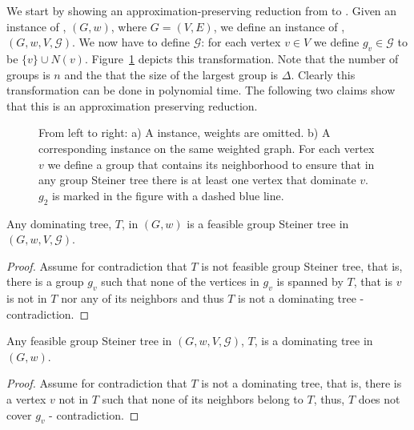 We start by showing an approximation-preserving reduction from \Prob{} to
\ProbGroup{}.
Given an instance of \Prob{}, $(G, w)$, where $G = (V, E)$, 
we define an instance of \ProbGroup{},
$(G, w, V, \mathcal{G})$.
We now have to define $\mathcal{G}$: for each vertex $v \in V$ we define 
$g_v \in \mathcal{G}$ to be $\{v\} \cup N(v)$.
Figure~\ref{fig:prob-leq-group} depicts this transformation.
Note that the number of groups is $n$ and the that the size of the largest group is $\Delta$.
Clearly this transformation can be done in polynomial time.
The following two claims show that this is an approximation preserving reduction. 

\begin{figure}
\begin{center}

\end{center}
\caption{\label{fig:prob-leq-group}
From left to right:
a) A \Prob{} instance, weights are omitted.
b) A corresponding \ProbGroup{} instance on the same weighted graph.
For each vertex $v$ we define a group
that contains its neighborhood to ensure that in any group Steiner tree there is at least
one vertex that dominate $v$.
$g_2$ is marked in the figure with a dashed blue line.  
}
\end{figure}

\begin{claim}
Any dominating tree, $T$, in $(G, w)$ is a feasible group Steiner tree in $(G, w, V, \mathcal{G})$.
\end{claim}

\begin{proof}
Assume for contradiction that $T$ is not feasible group Steiner tree, that is, there is 
a group $g_v$ such that none of the vertices in $g_v$ is spanned by $T$, that is $v$
is not in $T$ nor any of its neighbors and thus $T$ is not a dominating tree - contradiction. 
\end{proof}
 
\begin{claim}
Any feasible group Steiner tree in $(G, w, V, \mathcal{G})$, $T$, is a dominating tree
in $(G, w)$.
\end{claim}

\begin{proof}
Assume for contradiction that $T$ is not a dominating tree, that is, there is 
a vertex $v$ not in $T$ such that none of its neighbors belong to $T$, thus, 
$T$ does not cover $g_v$ - contradiction. 
\end{proof}
